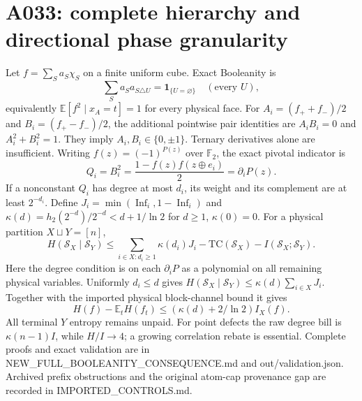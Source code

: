 \documentclass{article}
\begin{document}
\section*{A033: complete hierarchy and directional phase granularity}
Let $f=\sum_S a_S\chi_S$ on a finite uniform cube. Exact Booleanity is
\[
\sum_S a_Sa_{S\triangle U}=\mathbf1_{\{U=\varnothing\}}\quad(\text{every }U),
\]
equivalently $\mathbb E[f^2\mid x_A=t]=1$ for every physical face.
For $A_i=(f_++f_-)/2$ and $B_i=(f_+-f_-)/2$, the additional pointwise pair
identities are $A_iB_i=0$ and $A_i^2+B_i^2=1$. They imply
$A_i,B_i\in\{0,\pm1\}$. Ternary derivatives alone are insufficient.
Writing $f(z)=(-1)^{P(z)}$ over $\mathbb F_2$, the exact pivotal indicator is
\[
Q_i=B_i^2=\frac{1-f(z)f(z\oplus e_i)}2=\partial_iP(z).
\]
If a nonconstant $Q_i$ has degree at most $d_i$, its weight and its complement
are at least $2^{-d_i}$. Define $J_i=\min(\operatorname{Inf}_i,1-\operatorname{Inf}_i)$
and $\kappa(d)=h_2(2^{-d})/2^{-d}<d+1/\ln2$ for $d\ge1$, $\kappa(0)=0$.
For a physical partition $X\sqcup Y=[n]$,
\[
H(\mathcal S_X\mid\mathcal S_Y)
\le\sum_{i\in X:d_i\ge1}\kappa(d_i)J_i-\mathrm{TC}(\mathcal S_X)
-I(\mathcal S_X;\mathcal S_Y).
\]
Here the degree condition is on each $\partial_iP$ as a polynomial on all
remaining physical variables. Uniformly $d_i\le d$ gives
$H(\mathcal S_X\mid\mathcal S_Y)\le\kappa(d)\sum_{i\in X}J_i$.
Together with the imported physical block-channel bound it gives
\[
H(f)-\mathbb E_tH(f_t)\le(\kappa(d)+2/\ln2)I_X(f).
\]
All terminal $Y$ entropy remains unpaid. For point defects the raw degree bill
is $\kappa(n-1)I$, while $H/I\to4$; a growing correlation rebate is essential.
Complete proofs and exact validation are in NEW\_FULL\_BOOLEANITY\_CONSEQUENCE.md
and out/validation.json. Archived prefix obstructions and the original
atom-cap provenance gap are recorded in IMPORTED\_CONTROLS.md.
\end{document}
